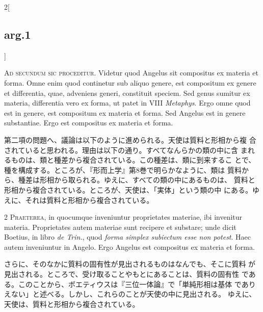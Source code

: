 \documentclass[paper=a4paper,fontsize=10pt,jafontsize=9pt,titlepage]{jlreq}
\begin{document}
\begin{paracol}{2}[\subsection{arg.1}]

{\huge A}{\scshape d secundum sic proceditur}. Videtur quod Angelus
 sit compositus ex materia et forma. Omne enim quod continetur sub
 aliquo genere, est compositum ex genere et differentia, quae,
 adveniens generi, constituit speciem. Sed genus sumitur ex materia,
 differentia vero ex forma, ut patet in VIII {\itshape Metaphys}. Ergo
 omne quod est in genere, est compositum ex materia et forma. Sed
 Angelus est in genere substantiae. Ergo est compositus ex materia et
 forma.

\switchcolumn

第二項の問題へ、議論は以下のように進められる。天使は質料と形相から複
 合されていると思われる。理由は以下の通り。すべてなんらかの類の中に含
 まれるものは、類と種差から複合されている。この種差は、類に到来するこ
 とで、種を構成する。ところが、『形而上学』第8巻で明らかなように、類は
 質料から、種差は形相から取られる。ゆえに、すべての類の中にあるものは、
 質料と形相から複合されている。ところが、天使は、「実体」という類の中
 にある。ゆえに、それは質料と形相から複合されている。


{\scshape 2 Praeterea}, in quocumque inveniuntur proprietates
 materiae, ibi invenitur materia. Proprietates autem materiae sunt
 recipere et substare; unde dicit Boetius, in libro {\itshape de
 Trin.}, quod {\itshape forma simplex subiectum esse non potest}. Haec
 autem inveniuntur in Angelo. Ergo Angelus est compositus ex materia
 et forma.

\switchcolumn

さらに、そのなかに質料の固有性が見出されるものはなんでも、そこに質料
 が見出される。ところで、受け取ることやもとにあることは、質料の固有性
 である。このことから、ボエティウスは『三位一体論』で「単純形相は基体
 でありえない」と述べる。しかし、これらのことが天使の中に見出される。
 ゆえに、天使は、質料と形相から複合されている。



\end{paracol}
\end{document}
